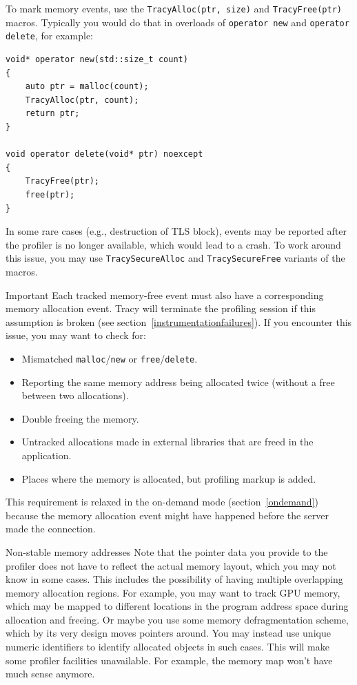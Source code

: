 \documentclass[hidelinks,titlepage,a4paper]{article}
\begin{document}
To mark memory events, use the \texttt{TracyAlloc(ptr, size)} and \texttt{TracyFree(ptr)} macros. Typically you would do that in overloads of \texttt{operator new} and \texttt{operator delete}, for example:

\begin{lstlisting}
void* operator new(std::size_t count)
{
    auto ptr = malloc(count);
    TracyAlloc(ptr, count);
    return ptr;
}

void operator delete(void* ptr) noexcept
{
    TracyFree(ptr);
    free(ptr);
}
\end{lstlisting}

In some rare cases (e.g., destruction of TLS block), events may be reported after the profiler is no longer available, which would lead to a crash. To work around this issue, you may use \texttt{TracySecureAlloc} and \texttt{TracySecureFree} variants of the macros.

\begin{bclogo}[
noborder=true,
couleur=black!5,
logo=\bcbombe
]{Important}
Each tracked memory-free event must also have a corresponding memory allocation event. Tracy will terminate the profiling session if this assumption is broken (see section~\ref{instrumentationfailures}). If you encounter this issue, you may want to check for:

\begin{itemize}
\item Mismatched \texttt{malloc}/\texttt{new} or \texttt{free}/\texttt{delete}.
\item Reporting the same memory address being allocated twice (without a free between two allocations).
\item Double freeing the memory.
\item Untracked allocations made in external libraries that are freed in the application.
\item Places where the memory is allocated, but profiling markup is added.
\end{itemize}

This requirement is relaxed in the on-demand mode (section~\ref{ondemand}) because the memory allocation event might have happened before the server made the connection.
\end{bclogo}

\begin{bclogo}[
noborder=true,
couleur=black!5,
logo=\bclampe
]{Non-stable memory addresses}
Note that the pointer data you provide to the profiler does not have to reflect the actual memory layout, which you may not know in some cases. This includes the possibility of having multiple overlapping memory allocation regions. For example, you may want to track GPU memory, which may be mapped to different locations in the program address space during allocation and freeing. Or maybe you use some memory defragmentation scheme, which by its very design moves pointers around. You may instead use unique numeric identifiers to identify allocated objects in such cases. This will make some profiler facilities unavailable. For example, the memory map won't have much sense anymore.
\end{bclogo}
\end{document}
